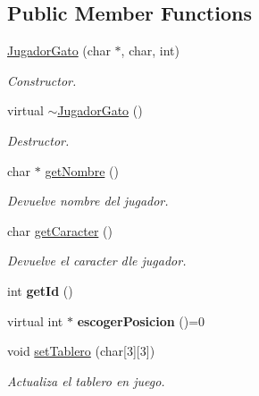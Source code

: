 \subsection*{Public Member Functions}
\begin{DoxyCompactItemize}
\item 
\hyperlink{class_jugador_gato_af067213fcf75bba0584b62224f37aaac}{Jugador\+Gato} (char $\ast$, char, int)
\begin{DoxyCompactList}\small\item\em Constructor. \end{DoxyCompactList}\item 
virtual \hyperlink{class_jugador_gato_aa1ce1ce7e08c10a1411a3fcf70db8927}{$\sim$\+Jugador\+Gato} ()\hypertarget{class_jugador_gato_aa1ce1ce7e08c10a1411a3fcf70db8927}{}\label{class_jugador_gato_aa1ce1ce7e08c10a1411a3fcf70db8927}

\begin{DoxyCompactList}\small\item\em Destructor. \end{DoxyCompactList}\item 
char $\ast$ \hyperlink{class_jugador_gato_a681a58adde0cf273a426d9e628d2cc6a}{get\+Nombre} ()
\begin{DoxyCompactList}\small\item\em Devuelve nombre del jugador. \end{DoxyCompactList}\item 
char \hyperlink{class_jugador_gato_ae62e53c1e01067ab60403f0043c1ac7d}{get\+Caracter} ()
\begin{DoxyCompactList}\small\item\em Devuelve el caracter dle jugador. \end{DoxyCompactList}\item 
int {\bfseries get\+Id} ()\hypertarget{class_jugador_gato_aade24ff7b78d966dacc92576be3cfd32}{}\label{class_jugador_gato_aade24ff7b78d966dacc92576be3cfd32}

\item 
virtual int $\ast$ {\bfseries escoger\+Posicion} ()=0\hypertarget{class_jugador_gato_aeb3128d82c7f772d7cde3742aa8005ce}{}\label{class_jugador_gato_aeb3128d82c7f772d7cde3742aa8005ce}

\item 
void \hyperlink{class_jugador_gato_ade6d9051e9248e0ad50c489966192c1f}{set\+Tablero} (char\mbox{[}3\mbox{]}\mbox{[}3\mbox{]})
\begin{DoxyCompactList}\small\item\em Actualiza el tablero en juego. \end{DoxyCompactList}\end{DoxyCompactItemize}
